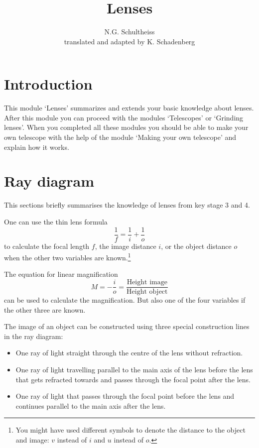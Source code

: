 \documentclass[12pt,a4paper]{article}
\author{N.G. Schultheiss \\ translated and adapted by K. Schadenberg}
\date{}
\title{Lenses}
\numberwithin{equation}{section}
\numberwithin{figure}{section}
\numberwithin{table}{section}
\begin{document}
\maketitle

\section{Introduction}
This module `Lenses' summarizes and extends your basic knowledge about lenses. After this module you can proceed with the modules `Telescopes' or `Grinding lenses'. When you completed all these modules you should be able to make your own telescope with the help of the module `Making your own telescope' and explain how it works.

\section{Ray diagram}
This sections briefly summarises the knowledge of lenses from key stage 3 and 4.

One can use the thin lens formula
\begin{equation}
\frac{1}{f}=\frac{1}{i}+\frac{1}{o} \label{eg:lens_equation}
\end{equation}
to calculate the focal length $f$, the image distance $i$, or the object distance $o$ when the other two variables are known.\footnote{You might have used different symbols to denote the distance to the object and image: $v$ instead of $i$ and $u$ instead of $o$.}

The equation for linear magnification
\begin{equation}
M = - \frac{i}{o} = \frac{\mbox{Height image}}{\mbox{Height object}}
\end{equation}
can be used to calculate the magnification. But also one of the four variables if the other three are known.

The image of an object can be constructed using three special construction lines in the ray diagram:
\begin{itemize}
\item One ray of light straight through the centre of the lens without refraction.
\item One ray of light travelling parallel to the main axis of the lens before the lens that gets refracted towards and passes through the focal point after the lens.
\item One ray of light that passes through the focal point before the lens and continues parallel to the main axis after the lens.
\end{itemize}
\end{document}
